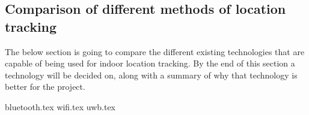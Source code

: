 \subsection{Comparison of different methods of location tracking}
The below section is going to compare the different existing technologies that are capable of being used for indoor location tracking. By the end of this section a technology will be decided on, along with a summary of why that technology is better for the project.

{bluetooth.tex}
{wifi.tex}
{uwb.tex}
